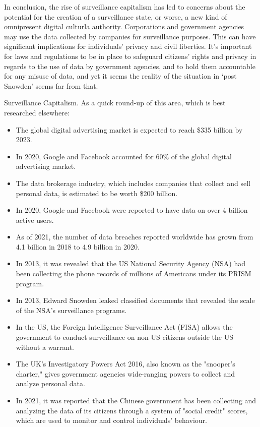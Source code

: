 In conclusion, the rise of surveillance capitalism has led to concerns about the potential for the creation of a surveillance state, or worse, a new kind of omnipresent digital culturla authority. Corporations and government agencies may use the data collected by companies for surveillance purposes. This can have significant implications for individuals' privacy and civil liberties. It's important for laws and regulations to be in place to safeguard citizens' rights and privacy in regards to the use of data by government agencies, and to hold them accountable for any misuse of data, and yet it seems the reality of the situation in `post Snowden' seems far from that.\par 
Surveillance Capitalism. As a quick round-up of this area, which is best researched elsewhere:
\begin{itemize}
\item The global digital advertising market is expected to reach \$335 billion by 2023.
\item In 2020, Google and Facebook accounted for 60\% of the global digital advertising market.
\item The data brokerage industry, which includes companies that collect and sell personal data, is estimated to be worth \$200 billion.
\item In 2020, Google and Facebook were reported to have data on over 4 billion active users.
\item As of 2021, the number of data breaches reported worldwide has grown from 4.1 billion in 2018 to 4.9 billion in 2020.
\item In 2013, it was revealed that the US National Security Agency (NSA) had been collecting the phone records of millions of Americans under its PRISM program.
\item In 2013, Edward Snowden leaked classified documents that revealed the scale of the NSA's surveillance programs.
\item In the US, the Foreign Intelligence Surveillance Act (FISA) allows the government to conduct surveillance on non-US citizens outside the US without a warrant.
\item The UK's Investigatory Powers Act 2016, also known as the "snooper's charter," gives government agencies wide-ranging powers to collect and analyze personal data.
\item In 2021, it was reported that the Chinese government has been collecting and analyzing the data of its citizens through a system of "social credit" scores, which are used to monitor and control individuals' behaviour.

\end{itemize}

